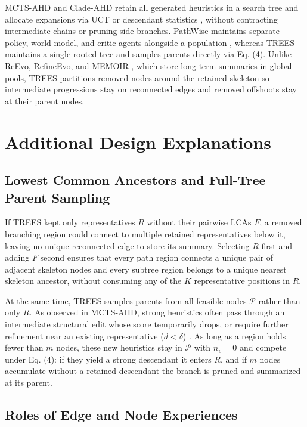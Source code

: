 \documentclass{article}
\begin{document}
MCTS-AHD and Clade-AHD retain all generated heuristics in a search tree and allocate expansions via UCT or descendant statistics \citep{mctsahd, cladeahd}, without contracting intermediate chains or pruning side branches. PathWise maintains separate policy, world-model, and critic agents alongside a population \citep{pathwise}, whereas TREES maintains a single rooted tree and samples parents directly via Eq. (4). Unlike ReEvo, RefineEvo, and MEMOIR \citep{reevo, refineevo, memorytree}, which store long-term summaries in global pools, TREES partitions removed nodes around the retained skeleton so intermediate progressions stay on reconnected edges and removed offshoots stay at their parent nodes.

\section{Additional Design Explanations}\label{additional-design-explanations}

\subsection{Lowest Common Ancestors and Full-Tree Parent Sampling}\label{lowest-common-ancestors-and-full-tree-parent-sampling}

If TREES kept only representatives \(R\) without their pairwise LCAs \(F\), a removed branching region could connect to multiple retained representatives below it, leaving no unique reconnected edge to store its summary. Selecting \(R\) first and adding \(F\) second ensures that every path region connects a unique pair of adjacent skeleton nodes and every subtree region belongs to a unique nearest skeleton ancestor, without consuming any of the \(K\) representative positions in \(R\).

At the same time, TREES samples parents from all feasible nodes \(\mathcal P\) rather than only \(R\). As observed in MCTS-AHD, strong heuristics often pass through an intermediate structural edit whose score temporarily drops, or require further refinement near an existing representative (\(d<\delta\)) \citep{mctsahd}. As long as a region holds fewer than \(m\) nodes, these new heuristics stay in \(\mathcal P\) with \(n_v=0\) and compete under Eq. (4): if they yield a strong descendant it enters \(R\), and if \(m\) nodes accumulate without a retained descendant the branch is pruned and summarized at its parent.

\subsection{Roles of Edge and Node Experiences}\label{roles-of-edge-and-node-experiences}
\end{document}
